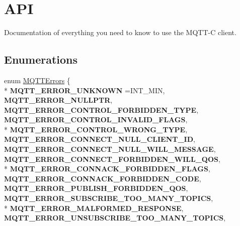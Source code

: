 \hypertarget{group__api}{}\section{A\+PI}
\label{group__api}


Documentation of everything you need to know to use the M\+Q\+T\+T-\/C client.  


\subsection*{Enumerations}
\begin{DoxyCompactItemize}
\item 
enum \hyperlink{group__api_gad0c901a8d30691ed0ca17915b691b7e7}{M\+Q\+T\+T\+Errors} \{ \\*
{\bfseries M\+Q\+T\+T\+\_\+\+E\+R\+R\+O\+R\+\_\+\+U\+N\+K\+N\+O\+WN} =I\+N\+T\+\_\+\+M\+IN, 
{\bfseries M\+Q\+T\+T\+\_\+\+E\+R\+R\+O\+R\+\_\+\+N\+U\+L\+L\+P\+TR}, 
{\bfseries M\+Q\+T\+T\+\_\+\+E\+R\+R\+O\+R\+\_\+\+C\+O\+N\+T\+R\+O\+L\+\_\+\+F\+O\+R\+B\+I\+D\+D\+E\+N\+\_\+\+T\+Y\+PE}, 
{\bfseries M\+Q\+T\+T\+\_\+\+E\+R\+R\+O\+R\+\_\+\+C\+O\+N\+T\+R\+O\+L\+\_\+\+I\+N\+V\+A\+L\+I\+D\+\_\+\+F\+L\+A\+GS}, 
\\*
{\bfseries M\+Q\+T\+T\+\_\+\+E\+R\+R\+O\+R\+\_\+\+C\+O\+N\+T\+R\+O\+L\+\_\+\+W\+R\+O\+N\+G\+\_\+\+T\+Y\+PE}, 
{\bfseries M\+Q\+T\+T\+\_\+\+E\+R\+R\+O\+R\+\_\+\+C\+O\+N\+N\+E\+C\+T\+\_\+\+N\+U\+L\+L\+\_\+\+C\+L\+I\+E\+N\+T\+\_\+\+ID}, 
{\bfseries M\+Q\+T\+T\+\_\+\+E\+R\+R\+O\+R\+\_\+\+C\+O\+N\+N\+E\+C\+T\+\_\+\+N\+U\+L\+L\+\_\+\+W\+I\+L\+L\+\_\+\+M\+E\+S\+S\+A\+GE}, 
{\bfseries M\+Q\+T\+T\+\_\+\+E\+R\+R\+O\+R\+\_\+\+C\+O\+N\+N\+E\+C\+T\+\_\+\+F\+O\+R\+B\+I\+D\+D\+E\+N\+\_\+\+W\+I\+L\+L\+\_\+\+Q\+OS}, 
\\*
{\bfseries M\+Q\+T\+T\+\_\+\+E\+R\+R\+O\+R\+\_\+\+C\+O\+N\+N\+A\+C\+K\+\_\+\+F\+O\+R\+B\+I\+D\+D\+E\+N\+\_\+\+F\+L\+A\+GS}, 
{\bfseries M\+Q\+T\+T\+\_\+\+E\+R\+R\+O\+R\+\_\+\+C\+O\+N\+N\+A\+C\+K\+\_\+\+F\+O\+R\+B\+I\+D\+D\+E\+N\+\_\+\+C\+O\+DE}, 
{\bfseries M\+Q\+T\+T\+\_\+\+E\+R\+R\+O\+R\+\_\+\+P\+U\+B\+L\+I\+S\+H\+\_\+\+F\+O\+R\+B\+I\+D\+D\+E\+N\+\_\+\+Q\+OS}, 
{\bfseries M\+Q\+T\+T\+\_\+\+E\+R\+R\+O\+R\+\_\+\+S\+U\+B\+S\+C\+R\+I\+B\+E\+\_\+\+T\+O\+O\+\_\+\+M\+A\+N\+Y\+\_\+\+T\+O\+P\+I\+CS}, 
\\*
{\bfseries M\+Q\+T\+T\+\_\+\+E\+R\+R\+O\+R\+\_\+\+M\+A\+L\+F\+O\+R\+M\+E\+D\+\_\+\+R\+E\+S\+P\+O\+N\+SE}, 
{\bfseries M\+Q\+T\+T\+\_\+\+E\+R\+R\+O\+R\+\_\+\+U\+N\+S\+U\+B\+S\+C\+R\+I\+B\+E\+\_\+\+T\+O\+O\+\_\+\+M\+A\+N\+Y\+\_\+\+T\+O\+P\+I\+CS}, 

\end{DoxyCompactItemize}
